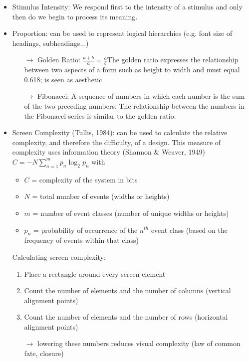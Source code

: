 \begin{itemize}
\item Stimulus Intensity: We respond first to the intensity of a stimulus and only then do we begin to process its meaning.
\item Proportion: can be used to represent logical hierarchies (e.g. font size of headings, subheadings...)
\begin{itemize}
\item[$\rightarrow$] Golden Ratio: $\frac{a+b}{a}=\frac{a}{b}$The golden ratio expresses the relationship between two aspects of a form such as height to width and must equal 0.618; is seen as aesthetic
\item[$\rightarrow$] Fibonacci: A sequence of numbers in which each number is the sum of the two preceding numbers. The relationship between the numbers in the Fibonacci series is similar to the golden ratio.
\end{itemize}
\item Screen Complexity (Tullis, 1984): can be used to calculate the relative complexity, and therefore the difficulty, of a design. This measure of complexity uses information theory (Shannon \& Weaver, 1949) $C = -N \sum\limits_{n=1}^m p_n \log_2 p_n$ with 
\begin{itemize}
\item $C$ = complexity of the system in bits
\item $N$ = total number of events (widths or heights)
\item $m$ = number of event classes (number of unique widths or heights)
\item $p_n$ = probability of occurrence of the $n^{th}$ event class (based on the frequency of events within that class)
\end{itemize}
Calculating screen complexity:
\begin{enumerate}
\item Place a rectangle around every screen element
\item Count the number of elements and the number of columns (vertical alignment points)
\item Count the number of elements and the number of rows (horizontal alignment points) 
\item[$\rightarrow$] lowering these numbers reduces visual complexity (law of common fate, closure) 
\end{enumerate}
\begin{figure}[h!]
	\begin{subfigure}{.7\textwidth}

\end{subfigure}
\end{figure}
\end{itemize}
